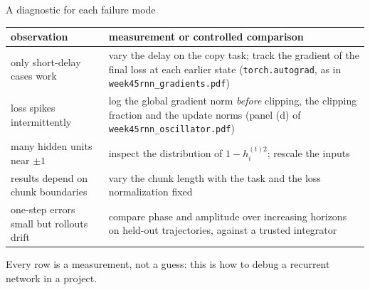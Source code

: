 \documentclass[10pt,aspectratio=169]{beamer}
\begin{document}
\begin{frame}{A diagnostic for each failure mode}
\small
\begin{center}
\begin{tabular}{p{4.4cm}p{8.4cm}}\toprule
observation & measurement or controlled comparison\\\midrule
only short-delay cases work & vary the delay on the copy task; track the gradient of the final loss at each earlier state (\texttt{torch.autograd}, as in \texttt{week45rnn\_gradients.pdf})\\[3pt]
loss spikes intermittently & log the global gradient norm \emph{before} clipping, the clipping fraction and the update norms (panel (d) of \texttt{week45rnn\_oscillator.pdf})\\[3pt]
many hidden units near $\pm1$ & inspect the distribution of $1-h^{(t)2}_i$; rescale the inputs\\[3pt]
results depend on chunk boundaries & vary the chunk length with the task and the loss normalization fixed\\[3pt]
one-step errors small but rollouts drift & compare phase and amplitude over increasing horizons on held-out trajectories, against a trusted integrator\\\bottomrule
\end{tabular}
\end{center}
Every row is a measurement, not a guess: this is how to debug a recurrent
network in a project.
\end{frame}


\end{document}
